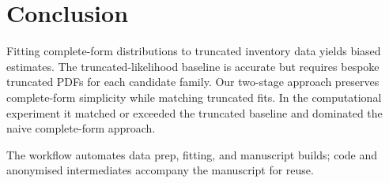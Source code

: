 \section{Conclusion}

\label{sec:conclusion}

Fitting complete-form distributions to truncated inventory data yields biased estimates. The truncated-likelihood baseline is accurate but requires bespoke truncated PDFs for each candidate family. Our two-stage approach preserves complete-form simplicity while matching truncated fits. In the computational experiment it matched or exceeded the truncated baseline and dominated the naive complete-form approach.

The workflow automates data prep, fitting, and manuscript builds; code and anonymised intermediates accompany the manuscript for reuse.
